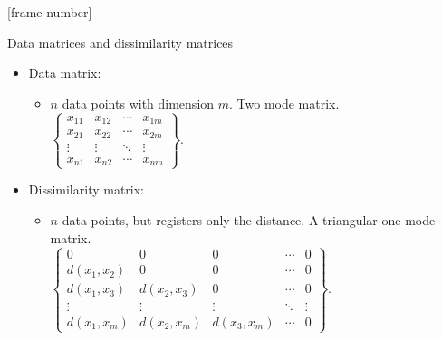 \documentclass[aspectratio=169,t]{beamer}
\begin{document}
  {
    [frame number]
    \begin{frame}{Data matrices and dissimilarity matrices}
    \centering
    \begin{itemize}
      \item Data matrix:
      \begin{itemize}
        \item $n$ data points with dimension $m$. Two mode matrix.\\
              {$\begin{Bmatrix}
              x_{11} & x_{12} & \cdots & x_{1m}\\
              x_{21} & x_{22} & \cdots & x_{2m}\\
              \vdots & \vdots & \ddots & \vdots\\
              x_{n1} & x_{n2} & \cdots & x_{nm}
              \end{Bmatrix}$.}
      \end{itemize}
      \item Dissimilarity matrix:
      \begin{itemize}
        \item $n$ data points, but registers only the distance. A triangular one mode matrix.\\
              {$\begin{Bmatrix}
              0 & 0 & 0 & \cdots & 0\\
              d(x_{1},x_{2}) & 0 & 0 & \cdots & 0\\
              d(x_{1},x_{3}) & d(x_{2},x_{3}) & 0 & \cdots & 0\\
              \vdots & \vdots & \vdots &\ddots & \vdots\\
              d(x_{1},x_{m}) & d(x_{2},x_{m}) & d(x_{3},x_{m}) & \cdots & 0
              \end{Bmatrix}$.}
      \end{itemize}
    \end{itemize}
    \end{frame}
  }
\end{document}
